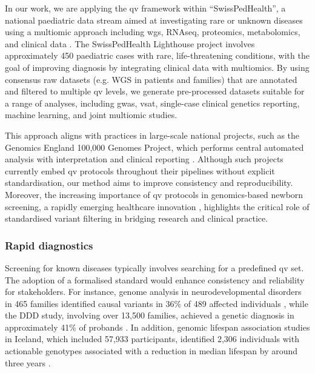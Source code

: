 In our work, we are applying the \ac{qv} framework within ``SwissPedHealth'', a national paediatric data stream aimed at investigating rare or unknown diseases using a multiomic approach including \ac{wgs}, RNAseq, proteomics, metabolomics, and clinical data \cite{mozun2024paediatric}. The SwissPedHealth Lighthouse project involves approximately 450 paediatric cases with rare, life-threatening conditions, with the goal of improving diagnosis by integrating clinical data with multiomics. By using consensus raw datasets (e.g. WGS in patients and families) that are annotated and filtered to multiple \ac{qv} levels, we generate pre-processed datasets suitable for a range of analyses, including \ac{gwas}, \ac{vsat}, single-case clinical genetics reporting, machine learning, and joint multiomic studies.

This approach aligns with practices in large-scale national projects, such as the Genomics England 100,000 Genomes Project, which performs central automated analysis with interpretation and clinical reporting \cite{turnbull2018100}. Although such projects currently embed \ac{qv} protocols throughout their pipelines without explicit standardisation, our method aims to improve consistency and reproducibility. Moreover, the increasing importance of \ac{qv} protocols in genomics-based newborn screening, a rapidly emerging healthcare innovation \cite{noauthor_every_2024}, highlights the critical role of standardised variant filtering in bridging research and clinical practice.

\subsubsection{Rapid diagnostics}
Screening for known diseases typically involves searching for a predefined \ac{qv} set. The adoption of a formalised standard would enhance consistency and reliability for stakeholders. For instance, genome analysis in neurodevelopmental disorders in 465 families identified causal variants in 36\% of 489 affected individuals \citep{sanchis2023genome}, while the DDD study, involving over 13,500 families, achieved a genetic diagnosis in approximately 41\% of probands \cite{wright2023genomic}. In addition, genomic lifespan association studies in Iceland, which included 57,933 participants, identified 2,306 individuals with actionable genotypes associated with a reduction in median lifespan by around three years \citep{jensson2023actionable}.


